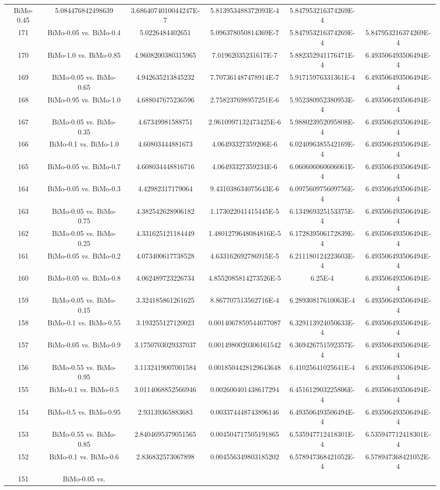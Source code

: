 \documentclass[a4paper,10pt]{article}
\begin{document}
\begin{landscape}
\begin{table}[!htp]
\begin{tabular}{cccccc}
BiMo-0.45&5.084476842498639&3.6864074010044247E-7&5.813953488372093E-4&5.847953216374269E-4\\171&BiMo-0.05 vs. BiMo-0.4&5.0226484402651&5.096378050814369E-7&5.847953216374269E-4&5.847953216374269E-4\\170&BiMo-1.0 vs. BiMo-0.85&4.9608200380315965&7.01962035231617E-7&5.882352941176471E-4&6.493506493506494E-4\\169&BiMo-0.05 vs. BiMo-0.65&4.942635213845232&7.707361487478914E-7&5.91715976331361E-4&6.493506493506494E-4\\168&BiMo-0.95 vs. BiMo-1.0&4.688047675236596&2.758237698957251E-6&5.952380952380953E-4&6.493506493506494E-4\\167&BiMo-0.05 vs. BiMo-0.35&4.67349981588751&2.9610997132473425E-6&5.988023952095808E-4&6.493506493506494E-4\\166&BiMo-0.1 vs. BiMo-1.0&4.60803444881673&4.06493327359206E-6&6.024096385542169E-4&6.493506493506494E-4\\165&BiMo-0.05 vs. BiMo-0.7&4.608034448816716&4.06493327359234E-6&6.060606060606061E-4&6.493506493506494E-4\\164&BiMo-0.05 vs. BiMo-0.3&4.42982317179064&9.431038634075643E-6&6.097560975609756E-4&6.493506493506494E-4\\163&BiMo-0.05 vs. BiMo-0.75&4.382542628906182&1.173022041415445E-5&6.134969325153375E-4&6.493506493506494E-4\\162&BiMo-0.05 vs. BiMo-0.25&4.331625121184449&1.4801279648084816E-5&6.172839506172839E-4&6.493506493506494E-4\\161&BiMo-0.05 vs. BiMo-0.2&4.073400617738528&4.633162692786915E-5&6.211180124223603E-4&6.493506493506494E-4\\160&BiMo-0.05 vs. BiMo-0.8&4.062489723226734&4.8552085814273526E-5&6.25E-4&6.493506493506494E-4\\159&BiMo-0.05 vs. BiMo-0.15&3.324185861261625&8.867707513562716E-4&6.28930817610063E-4&6.493506493506494E-4\\158&BiMo-0.1 vs. BiMo-0.55&3.193255127120023&0.0014067859544677087&6.329113924050633E-4&6.493506493506494E-4\\157&BiMo-0.05 vs. BiMo-0.9&3.1750703029337037&0.0014980020306161542&6.369426751592357E-4&6.493506493506494E-4\\156&BiMo-0.55 vs. BiMo-0.95&3.1132419007001584&0.0018504428129643648&6.41025641025641E-4&6.493506493506494E-4\\155&BiMo-0.1 vs. BiMo-0.5&3.0114068852566946&0.002600401438617294&6.451612903225806E-4&6.493506493506494E-4\\154&BiMo-0.5 vs. BiMo-0.95&2.93139365883683&0.003374448743896146&6.493506493506494E-4&6.493506493506494E-4\\153&BiMo-0.55 vs. BiMo-0.85&2.8404695379051565&0.004504717505191865&6.535947712418301E-4&6.535947712418301E-4\\152&BiMo-0.1 vs. BiMo-0.6&2.836832573067898&0.004556349803185202&6.578947368421052E-4&6.578947368421052E-4\\151&BiMo-0.05 vs. 
\end{tabular}
\end{table}
\end{landscape}
\end{document}
